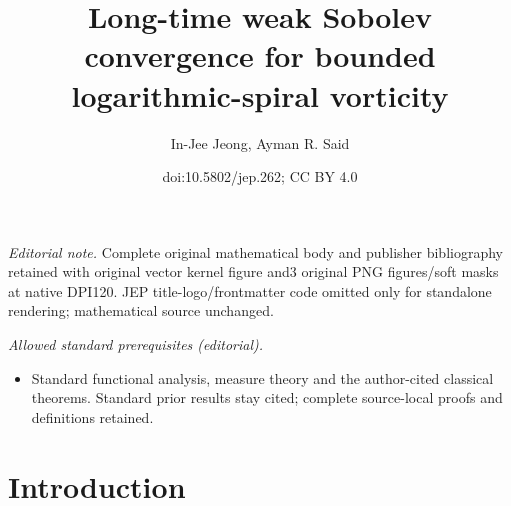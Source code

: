 \documentclass[10pt]{amsart}
\title{Long-time weak Sobolev convergence for bounded logarithmic-spiral vorticity}
\author{In-Jee Jeong, Ayman R. Said}
\date{doi:10.5802/jep.262; CC BY 4.0}
\theoremstyle{plain}
\theoremstyle{definition}
\begin{document}
\maketitle
\noindent\textit{Editorial note.} Complete original mathematical body and publisher bibliography retained with original vector kernel figure and3 original PNG figures/soft masks at native DPI120. JEP title-logo/frontmatter code omitted only for standalone rendering; mathematical source unchanged.\par\medskip
\noindent\textit{Allowed standard prerequisites (editorial).}\begin{itemize}
\item Standard functional analysis, measure theory and the author-cited classical theorems. Standard prior results stay cited; complete source-local proofs and definitions retained.
\end{itemize}\medskip
\vspace*{-.1\baselineskip}
\tableofcontents


\section{Introduction}
\end{document}
